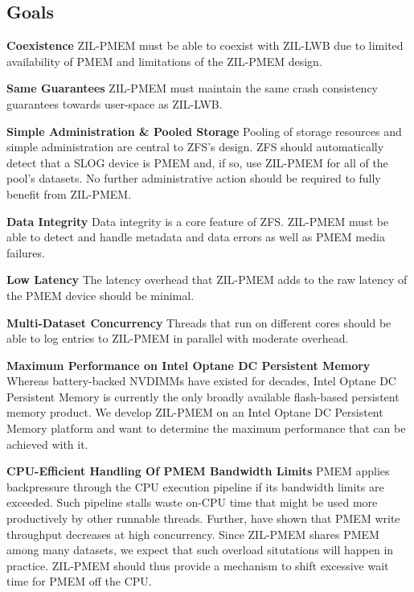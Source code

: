 \documentclass[12pt,a4paper,twoside,draft]{book}
\begin{document}
\subsection{Goals}

\newcommand{\csgoal}[1]{\textbf{#1}}

\csgoal{Coexistence}
ZIL-PMEM must be able to coexist with ZIL-LWB due to limited availability of PMEM and limitations of the ZIL-PMEM design.

\csgoal{Same Guarantees}
ZIL-PMEM must maintain the same crash consistency guarantees towards user-space as ZIL-LWB.

\csgoal{Simple Administration \& Pooled Storage}
Pooling of storage resources and simple administration are central to ZFS's design.\cite{zfspaper}
ZFS should automatically detect that a SLOG device is PMEM and, if so, use ZIL-PMEM for all of the pool’s datasets.
No further administrative action should be required to fully benefit from ZIL-PMEM.

\csgoal{Data Integrity}
Data integrity is a core feature of ZFS.\cite{zfspaper}
ZIL-PMEM must be able to detect and handle metadata and data errors as well as PMEM media failures.

\csgoal{Low Latency}
The latency overhead that ZIL-PMEM adds to the raw latency of the PMEM device should be minimal.

\csgoal{Multi-Dataset Concurrency}
Threads that run on different cores should be able to log entries to ZIL-PMEM in parallel with moderate overhead.

\csgoal{Maximum Performance on Intel Optane DC Persistent Memory}
Whereas battery-backed NVDIMMs have existed for decades, Intel Optane DC Persistent Memory is currently the only broadly available flash-based persistent memory product.
We develop ZIL-PMEM on an Intel Optane DC Persistent Memory platform and want to determine the maximum performance that can be achieved with it.

\csgoal{CPU-Efficient Handling Of PMEM Bandwidth Limits}
PMEM applies backpressure through the CPU execution pipeline if its bandwidth limits are exceeded.
Such pipeline stalls waste on-CPU time that might be used more productively by other runnable threads.
Further, \citeauthor{yang_empirical_2020} have shown that PMEM write throughput decreases at high concurrency.
Since ZIL-PMEM shares PMEM among many datasets, we expect that such overload situtations will happen in practice.
ZIL-PMEM should thus provide a mechanism to shift excessive wait time for PMEM off the CPU.
\end{document}
